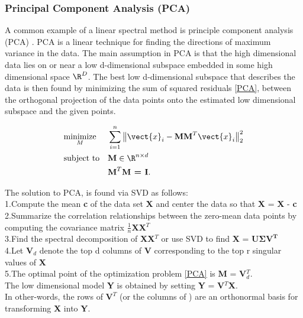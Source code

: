 \subsubsection{Principal Component Analysis (PCA)}
A common example of a linear spectral method is principle component analysis (PCA) \cite{JolliffeIT1986PCAa}. PCA is a linear technique for finding the directions
of maximum variance in the data. The main assumption in PCA is that the high dimensional data lies on or near a low d-dimensional subspace embedded in some high dimensional space $\R^{D}$. The best low d-dimensional subspace that describes the data is then found by minimizing the sum of squared residuals    \eqref{PCA}, between the orthogonal projection of the data  points onto the estimated low dimensional subspace and the given points.

\begin{equation}\label{PCA}
\begin{aligned}
& \underset{M}{\text{minimize}}
& & \sum_{i=1}^{n} \big \lVert \vect{x}_{i} - \textbf{MM}^{T}\vect{x}_{i} \big \rVert_{2}^{2} \\
& \text{subject to}
& & \textbf{M} \in \R^{n \times d} \\
&&& \textbf{M}^{T}\textbf{M = I}.
\end{aligned}
\end{equation}

The solution to PCA, is found via SVD \cite{Agricultural1938,BishopChristopherM2006Pram, AmericanMathematicalSociety.1939Apat} as follows:\\
1.Compute the mean \textbf{c} of the data set \textbf{X} and center
the data so that \textbf{X} = \textbf{X} - \textbf{c}\\
2.Summarize the correlation relationships between the zero-mean data points by computing the covariance matrix $\frac{1}{n}$\textbf{XX}$^{T}$\\
3.Find the spectral decomposition of \textbf{XX}$^{T}$ or 
use SVD to find \textbf{X} = $\bm{U\Sigma V^{T}}$\\
4.Let $\bm{V}_{d}$ denote the top d columns of \textbf{V} corresponding to the  top r singular values of \textbf{X}\\
5.The optimal point of the optimization problem \eqref{PCA} is \textbf{M} = \textbf{V}$_{d}^{T}$.\\
The low dimensional model \textbf{Y} is obtained by setting \textbf{Y} = \textbf{V}$^{T}$\textbf{X}.\\
In other-words, the rows of $\textbf{V}^{T}$ (or the columns of ) are an orthonormal basis for transforming \textbf{X} into \textbf{Y}.\\


